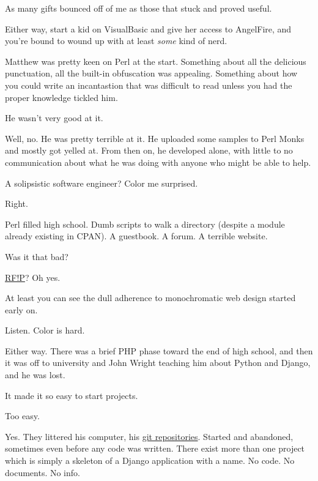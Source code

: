 As many gifts bounced off of me as those that stuck and proved useful.

Either way, start a kid on VisualBasic and give her access to AngelFire, and you're bound to wound up with at least \emph{some} kind of nerd.
\newpage

Matthew was pretty keen on Perl at the start. Something about all the delicious punctuation, all the built-in obfuscation was appealing. Something about how you could write an incantastion that was difficult to read unless you had the proper knowledge tickled him.

\begin{ally}
He wasn't very good at it.
\end{ally}
Well, no. He was pretty terrible at it. He uploaded some samples to Perl Monks and mostly got yelled at. From then on, he developed alone, with little to no communication about what he was doing with anyone who might be able to help.

\begin{ally}
A solipsistic software engineer? Color me surprised.
\end{ally}
Right.

Perl filled high school. Dumb scripts to walk a directory (despite a module already existing in CPAN). A guestbook. A forum. A terrible website.

\begin{ally}
Was it that bad?
\end{ally}
\href{https://web.archive.org/web/20050202100148/http://ranna.babylonia.flatirons.org/}{RF!P}? Oh yes.

\begin{ally}
At least you can see the dull adherence to monochromatic web design started early on.
\end{ally}
Listen. Color is hard.

Either way. There was a brief PHP phase toward the end of high school, and then it was off to university and John Wright teaching him about Python and Django, and he was lost.

It made it so easy to start projects.

\begin{ally}
Too easy.
\end{ally}
Yes. They littered his computer, his \href{https://github.com/makyo-old/}{git repositories}. Started and abandoned, sometimes even before any code was written. There exist more than one project which is simply a skeleton of a Django application with a name. No code. No documents. No info.

